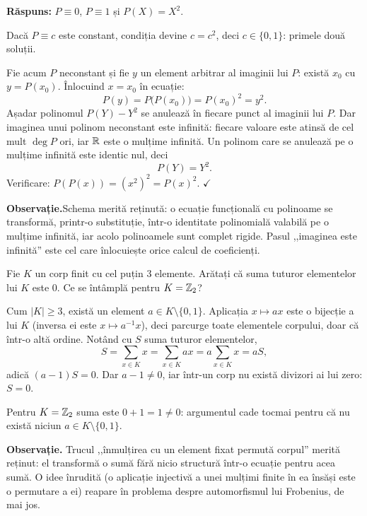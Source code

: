 \begin{solutie}
\textbf{Răspuns:} $P \equiv 0$, $P \equiv 1$ și $P(X) = X^2$.

Dacă $P \equiv c$ este constant, condiția devine $c = c^2$, deci $c \in \{0,1\}$: primele două soluții.

Fie acum $P$ neconstant și fie $y$ un element arbitrar al imaginii lui $P$: există $x_0$ cu $y = P(x_0)$. Înlocuind $x = x_0$ în ecuație:
\[
  P(y) = P\bigl(P(x_0)\bigr) = P(x_0)^2 = y^2.
\]
Așadar polinomul $P(Y) - Y^2$ se anulează în fiecare punct al imaginii lui $P$. Dar imaginea unui polinom neconstant este infinită: fiecare valoare este atinsă de cel mult $\deg P$ ori, iar $\mathbb{R}$ este o mulțime infinită. Un polinom care se anulează pe o mulțime infinită este identic nul, deci
\[
  P(Y) = Y^2.
\]
Verificare: $P(P(x)) = (x^2)^2 = P(x)^2$. $\checkmark$

\medskip
\noindent\textbf{Observație.}\quad Schema merită reținută: o ecuație funcțională cu polinoame se transformă, printr-o substituție, într-o identitate polinomială valabilă pe o mulțime infinită, iar acolo polinoamele sunt complet rigide. Pasul ,,imaginea este infinită'' este cel care înlocuiește orice calcul de coeficienți.
\end{solutie}

\begin{problema}[Clasică]
Fie $K$ un corp finit cu cel puțin 3 elemente. Arătați că suma tuturor elementelor lui $K$ este 0. Ce se întâmplă pentru $K = \mathbb{Z}_2$?
\end{problema}

\begin{solutie}
Cum $|K| \geq 3$, există un element $a \in K \setminus \{0,1\}$. Aplicația $x \mapsto ax$ este o bijecție a lui $K$ (inversa ei este $x \mapsto a^{-1}x$), deci parcurge toate elementele corpului, doar că într-o altă ordine. Notând cu $S$ suma tuturor elementelor,
\[
S = \sum_{x \in K} x = \sum_{x \in K} ax = a \sum_{x \in K} x = aS,
\]
adică $(a-1)S = 0$. Dar $a-1 \neq 0$, iar într-un corp nu există divizori ai lui zero: $S = 0$.

Pentru $K = \mathbb{Z}_2$ suma este $0+1 = 1 \neq 0$: argumentul cade tocmai pentru că nu există niciun $a \in K \setminus \{0,1\}$.

\medskip
\noindent\textbf{Observație.} Trucul ,,înmulțirea cu un element fixat permută corpul'' merită reținut: el transformă o sumă fără nicio structură într-o ecuație pentru acea sumă. O idee înrudită (o aplicație injectivă a unei mulțimi finite în ea însăși este o permutare a ei) reapare în problema despre automorfismul lui Frobenius, de mai jos.
\end{solutie}

